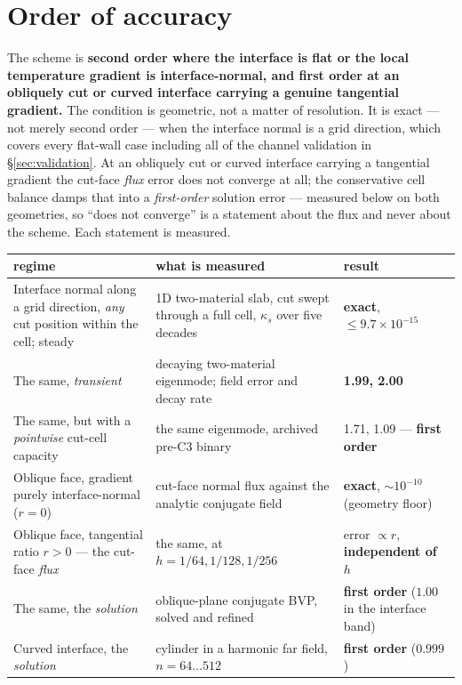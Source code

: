 \documentclass[11pt,a4paper]{article}
\begin{document}
\section{Order of accuracy}
\label{sec:order}

The scheme is \textbf{second order where the interface is flat or the local
temperature gradient is interface-normal, and first order at an obliquely cut or
curved interface carrying a genuine tangential gradient.} The condition is geometric,
not a matter of resolution. It is exact --- not merely second order --- when
the interface normal is a grid direction, which covers every flat-wall case
including all of the channel validation in \S\ref{sec:validation}. At an
obliquely cut or curved interface carrying a tangential gradient the cut-face
\emph{flux} error does not converge at all; the conservative cell balance
damps that into a \emph{first-order} solution error --- measured below on both
geometries, so ``does not converge'' is a statement about the flux and never
about the scheme. Each statement is measured.

\begin{center}
\begin{tabular}{p{6.1cm}p{4.0cm}l}
\toprule
regime & what is measured & result \\
\midrule
Interface normal along a grid direction, \emph{any} cut position within the
cell; steady & 1D two-material slab, cut swept through a full cell,
$\kappa_s$ over five decades & \textbf{exact},
$\le 9.7\times10^{-15}$ \\[2mm]
The same, \emph{transient} & decaying two-material eigenmode; field error and
decay rate & \textbf{1.99, 2.00} \\[2mm]
The same, but with a \emph{pointwise} cut-cell capacity & the same eigenmode,
archived pre-C3 binary & 1.71, 1.09 --- \textbf{first order} \\[2mm]
Oblique face, gradient purely interface-normal ($r=0$) & cut-face normal flux
against the analytic conjugate field & \textbf{exact},
$\sim10^{-10}$ (geometry floor) \\[2mm]
Oblique face, tangential ratio $r>0$ --- the cut-face \emph{flux} & the same,
at $h=1/64,1/128,1/256$ & error $\propto r$, \textbf{independent of $h$}
\\[2mm]
The same, the \emph{solution} & oblique-plane conjugate BVP, solved and
refined & \textbf{first order} ($1.00$ in the interface band) \\[2mm]
Curved interface, the \emph{solution} & cylinder in a harmonic far field,
$n=64\ldots512$ & \textbf{first order} ($0.999$) \\
\bottomrule
\end{tabular}
\end{center}
\end{document}
